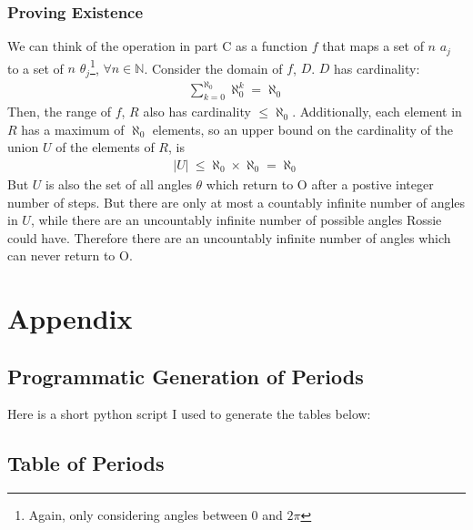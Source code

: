 \documentclass{article}
\begin{document}
  \subsubsection{Proving Existence}
  We can think of the operation in part C as a function $f$ that maps a set of $n$ $a_j$ to a set of $n$ $\theta_j$\footnote{Again, only considering angles between 0 and $2\pi$}, $\forall n \in \mathbb{N}$. Consider the domain of $f$, $D$. $D$ has cardinality:
  \begin{align}
    \sum^{\aleph_0}_{k=0}\aleph_0^k = \aleph_0
  \end{align}
  Then, the range of $f$, $R$ also has cardinality $\leq \aleph_0$. Additionally, each element in $R$ has a maximum of $\aleph_0$ elements, so an upper bound on the cardinality of the union $U$ of the elements of $R$, is
  \begin{align}
    \rvert U \lvert \  \leq \aleph_0 \times \aleph_0 = \aleph_0
  \end{align}
  But $U$ is also the set of all angles $\theta$ which return to O after a postive integer number of steps. But there are only at most a countably infinite number of angles in $U$, while there are an uncountably infinite number of possible angles Rossie could have. Therefore there are an uncountably infinite number of angles which can never return to O.
  \section{Appendix}
  \subsection{Programmatic Generation of Periods}
  Here is a short python script I used to generate the tables below:
  
  \subsection{Table of Periods}
\end{document}
